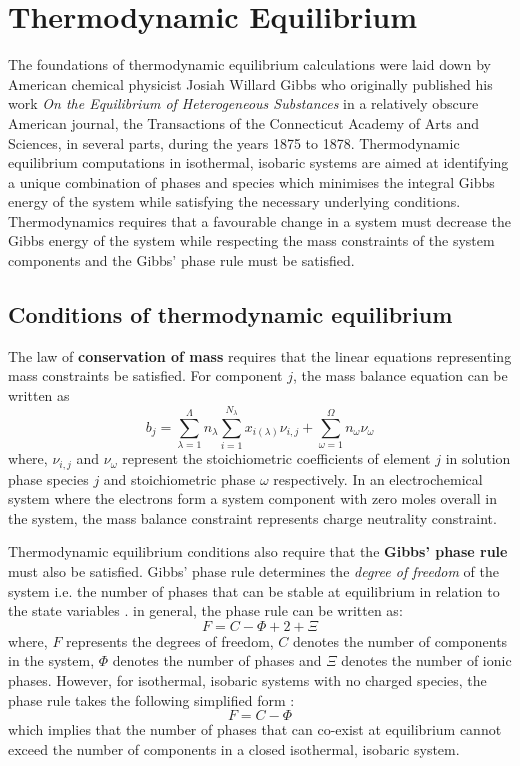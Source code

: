 \section{Thermodynamic Equilibrium}
	The foundations of thermodynamic equilibrium calculations were laid down by American chemical physicist Josiah Willard Gibbs who originally published his work \emph{On the Equilibrium of Heterogeneous Substances} in a relatively obscure American journal, the Transactions of the Connecticut Academy of Arts and Sciences, in several parts, during the years 1875 to 1878. Thermodynamic equilibrium computations in isothermal, isobaric systems are aimed at identifying a unique combination of phases and species which minimises the integral Gibbs energy of the system while satisfying the necessary underlying conditions. Thermodynamics requires that a favourable change in a system must decrease the Gibbs energy of the system while respecting the mass constraints of the system components and the Gibbs' phase rule must be satisfied. 	
	\subsection{Conditions of thermodynamic equilibrium}\label{sec:eqb_theory}
		The law of \textbf{conservation of mass} requires that the linear equations representing mass constraints be satisfied. For component $j$, the mass balance equation can be written as
			\begin{equation}\label{eq:massbalance}
				b_j = \sum_{\lambda=1}^{\Lambda} n_{\lambda}\sum_{i=1}^{N_{\lambda}}x_{i({\lambda})}{\nu}_{i,j} +  \sum_{\omega=1}^{\Omega} n_{\omega}{\nu}_{\omega}
			\end{equation}
			where, ${\nu}_{i,j}$ and ${\nu}_{\omega}$ represent the stoichiometric coefficients of element $j$ in solution phase species $j$ and stoichiometric phase $\omega$ respectively. In an electrochemical system where the electrons form a system component with zero moles overall in the system, the mass balance constraint represents charge neutrality constraint.
			
		Thermodynamic equilibrium conditions also require that the \textbf{Gibbs' phase rule} must also be satisfied. Gibbs' phase rule determines the \emph{degree of freedom} of the system i.e. the number of phases that can be stable at equilibrium in relation to the state variables \cite{Gibbs:1878aa}. in general, the phase rule can be written as: 
			\begin{equation} 
                			F=C-\Phi + 2 + \Xi
            		\end{equation}
            		where, $F$ represents the degrees of freedom, $C$ denotes the number of components in the system, $\Phi$ denotes the number of phases and $\Xi$ denotes the number of ionic phases. However, for isothermal, isobaric systems with no charged species, the phase rule takes the following simplified form :
			\begin{equation}
                			F=C-\Phi
            		\end{equation}
			which implies that the number of phases that can co-exist at equilibrium cannot exceed the number of components in a closed isothermal, isobaric system.
			
